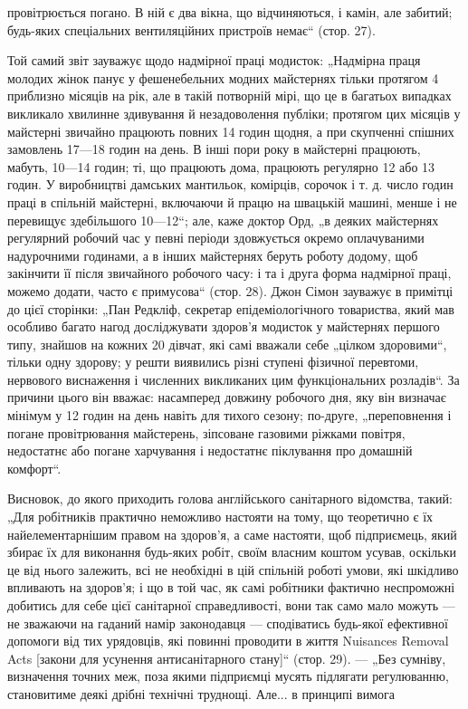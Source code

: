 \parcont{}  %
провітрюється погано. В ній є два вікна, що відчиняються, і камін,
але забитий; будь-яких спеціальних вентиляційних пристроїв немає“ (стор. 27).

Той самий звіт зауважує щодо надмірної праці модисток:
„Надмірна праця молодих жінок панує у фешенебельних модних майстернях тільки протягом 4 приблизно
місяців на рік,
але в такій потворній мірі, що це в багатьох випадках викликало хвилинне здивування й незадоволення
публіки; протягом
цих місяців у майстерні звичайно працюють повних 14 годин
щодня, а при скупченні спішних замовлень 17—18 годин на день.
В інші пори року в майстерні працюють, мабуть, 10—14 годин;
ті, що працюють дома, працюють регулярно 12 або 13 годин.
У виробництві дамських мантильок, комірців, сорочок і т. д.
число годин праці в спільній майстерні, включаючи й працю на
швацькій машині, менше і не перевищує здебільшого 10—12“;
але, каже доктор Орд, „в деяких майстернях регулярний робочий час у певні періоди здовжується окремо
оплачуваними надурочними годинами, а в інших майстернях беруть роботу додому, щоб закінчити її після
звичайного робочого часу: і та
і друга форма надмірної праці, можемо додати, часто є примусова“ (стор. 28). Джон Сімон зауважує в
примітці до цієї сторінки: „Пан Редкліф, секретар епідеміологічного товариства,
який мав особливо багато нагод досліджувати здоров’я модисток
у майстернях першого типу, знайшов на кожних 20 дівчат, які
самі вважали себе „цілком здоровими“, тільки одну здорову;
у решти виявились різні ступені фізичної перевтоми, нервового
виснаження і численних викликаних цим функціональних розладів“.
За причини цього він вважає: насамперед довжину робочого
дня, яку він визначає мінімум у 12 годин на день навіть для
тихого сезону; по-друге, „переповнення і погане провітрювання
майстерень, зіпсоване газовими ріжками повітря, недостатнє
або погане харчування і недостатнє піклування про домашній
комфорт“.

Висновок, до якого приходить голова англійського санітарного відомства, такий: „Для робітників
практично неможливо
настояти на тому, що теоретично є їх найелементарнішим правом
на здоров’я, а саме настояти, щоб підприємець, який збирає
їх для виконання будь-яких робіт, своїм власним коштом усував,
оскільки це від нього залежить, всі не необхідні в цій спільній
роботі умови, які шкідливо впливають на здоров’я; і що в той
час, як самі робітники фактично неспроможні добитись для себе
цієї санітарної справедливості, вони так само мало можуть —
не зважаючи на гаданий намір законодавця — сподіватись будь-якої ефективної допомоги від тих
урядовців, які повинні проводити в життя Nuisances Removal Acts [закони для усунення антисанітарного
стану]“ (стор. 29). — „Без сумніву, визначення точних меж, поза якими підприємці мусять підлягати
регулюванню, становитиме деякі дрібні технічні труднощі. Але... в принципі вимога
\parbreak{}  %

